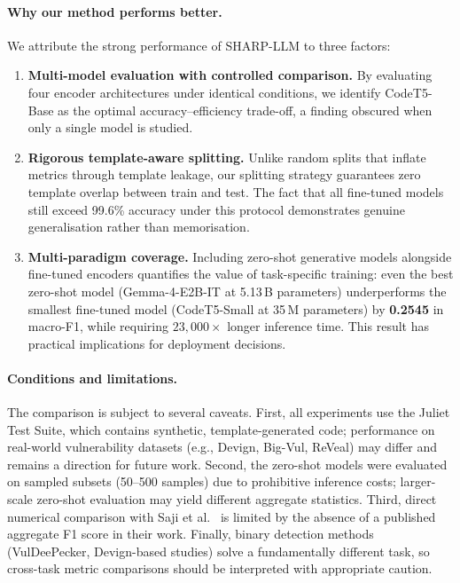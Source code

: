 \paragraph{Why our method performs better.}
We attribute the strong performance of SHARP-LLM to three factors:
\begin{enumerate}
    \item \textbf{Multi-model evaluation with controlled comparison.}
          By evaluating four encoder architectures under identical
          conditions, we identify CodeT5-Base as the optimal
          accuracy--efficiency trade-off, a finding obscured when only a
          single model is studied.
    \item \textbf{Rigorous template-aware splitting.}
          Unlike random splits that inflate metrics through template
          leakage, our splitting strategy guarantees zero template overlap
          between train and test.  The fact that all fine-tuned models
          still exceed 99.6\% accuracy under this protocol demonstrates
          genuine generalisation rather than memorisation.
    \item \textbf{Multi-paradigm coverage.}
          Including zero-shot generative models alongside fine-tuned
          encoders quantifies the value of task-specific training:
          even the best zero-shot model (Gemma-4-E2B-IT at 5.13\,B
          parameters) underperforms the smallest fine-tuned model
          (CodeT5-Small at 35\,M parameters) by \textbf{0.2545} in
          macro-F1, while requiring $23{,}000\times$ longer inference
          time.  This result has practical implications for deployment
          decisions.
\end{enumerate}

\paragraph{Conditions and limitations.}
The comparison is subject to several caveats.  First, all experiments
use the Juliet Test Suite, which contains synthetic, template-generated
code; performance on real-world vulnerability datasets (e.g., Devign,
Big-Vul, ReVeal) may differ and remains a direction for future work.
Second, the zero-shot models were evaluated on sampled subsets (50--500
samples) due to prohibitive inference costs; larger-scale zero-shot
evaluation may yield different aggregate statistics.  Third, direct
numerical comparison with Saji et al.~\cite{saji2025efficient} is
limited by the absence of a published aggregate F1 score in their work.
Finally, binary detection methods (VulDeePecker, Devign-based studies)
solve a fundamentally different task, so cross-task metric comparisons
should be interpreted with appropriate caution.
